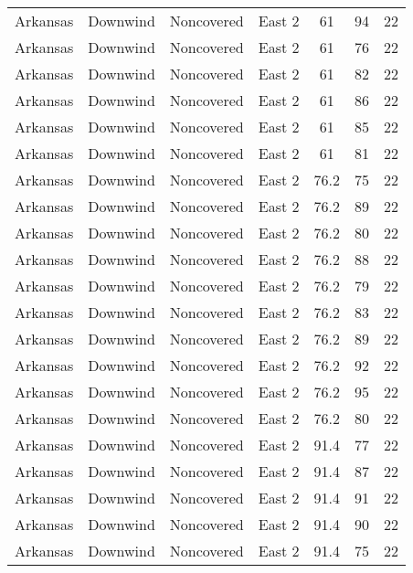 \documentclass{article}
\begin{document}
\begin{longtable}[H]{ccccccc}
Arkansas & Downwind  & Noncovered & East 2        & 61           & 94          & 22  \\
Arkansas & Downwind  & Noncovered & East 2        & 61           & 76          & 22  \\
Arkansas & Downwind  & Noncovered & East 2        & 61           & 82          & 22  \\
Arkansas & Downwind  & Noncovered & East 2        & 61           & 86          & 22  \\
Arkansas & Downwind  & Noncovered & East 2        & 61           & 85          & 22  \\
Arkansas & Downwind  & Noncovered & East 2        & 61           & 81          & 22  \\
Arkansas & Downwind  & Noncovered & East 2        & 76.2         & 75          & 22  \\
Arkansas & Downwind  & Noncovered & East 2        & 76.2         & 89          & 22  \\
Arkansas & Downwind  & Noncovered & East 2        & 76.2         & 80          & 22  \\
Arkansas & Downwind  & Noncovered & East 2        & 76.2         & 88          & 22  \\
Arkansas & Downwind  & Noncovered & East 2        & 76.2         & 79          & 22  \\
Arkansas & Downwind  & Noncovered & East 2        & 76.2         & 83          & 22  \\
Arkansas & Downwind  & Noncovered & East 2        & 76.2         & 89          & 22  \\
Arkansas & Downwind  & Noncovered & East 2        & 76.2         & 92          & 22  \\
Arkansas & Downwind  & Noncovered & East 2        & 76.2         & 95          & 22  \\
Arkansas & Downwind  & Noncovered & East 2        & 76.2         & 80          & 22  \\
Arkansas & Downwind  & Noncovered & East 2        & 91.4         & 77          & 22  \\
Arkansas & Downwind  & Noncovered & East 2        & 91.4         & 87          & 22  \\
Arkansas & Downwind  & Noncovered & East 2        & 91.4         & 91          & 22  \\
Arkansas & Downwind  & Noncovered & East 2        & 91.4         & 90          & 22  \\
Arkansas & Downwind  & Noncovered & East 2        & 91.4         & 75          & 22  \\

\end{longtable}
\end{document}
